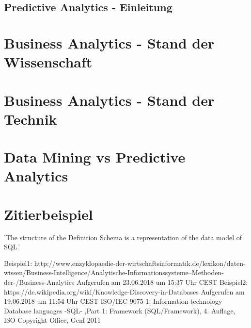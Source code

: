 \documentclass[12pt,twocolumn,twoside]{conference}   %
\begin{document}
\subsection{Predictive Analytics - Einleitung}
\section{Business Analytics - Stand der Wissenschaft}
\section{Business Analytics - Stand der Technik}

\section{Data Mining vs Predictive Analytics}








\section{Zitierbeispiel}
'The structure of the Definition Schema is a representation of the data model of SQL.' \cite{ISO9075-1:2011}


\newpage

\begin{thebibliography}{99}
	Beispiel1: http://www.enzyklopaedie-der-wirtschaftsinformatik.de/lexikon/daten-wissen/Business-Intelligence/Analytische-Informationssysteme--Methoden-der-/Business-Analytics 
	Aufgerufen am 23.06.2018 um 15:37 Uhr CEST
	Beispiel2: https://de.wikipedia.org/wiki/Knowledge-Discovery-in-Databases
	Aufgerufen am 19.06.2018 um 11:54 Uhr CEST
	ISO/IEC 9075-1: Information technology
	Database languages -SQL- ,Part 1: Framework
	(SQL/Framework), 4. Auflage, ISO Copyright Office,
	Genf 2011
\end{thebibliography}
\end{document}
